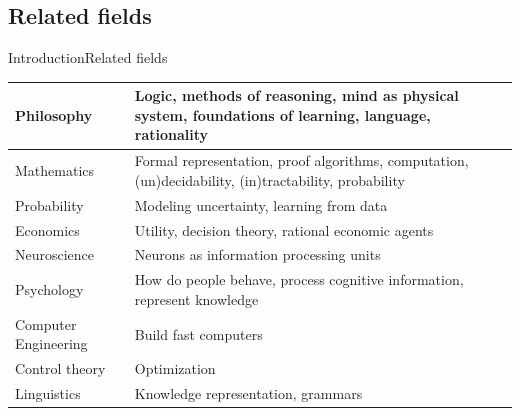 \documentclass[10pt,compress]{beamer} %
\begin{document}
\subsection{Related fields}
\begin{frame}{Introduction}{Related fields}
	\vspace{-0.8cm}
	\begin{center}
	\begin{tabular}{|p{2.5cm}|p{8cm}|}\hline
	Philosophy  & Logic, methods of reasoning, mind as physical system, foundations of learning, language, rationality\\\hline
	Mathematics & Formal representation, proof algorithms, computation, (un)decidability, (in)tractability, probability\\\hline
	Probability & Modeling uncertainty, learning from data\\\hline
	Economics   & Utility, decision theory, rational economic agents\\\hline
	Neuroscience& Neurons as information processing units\\\hline
	Psychology  & How do people behave, process cognitive information, represent knowledge\\\hline
	Computer Engineering & Build fast computers\\\hline
	Control theory & Optimization\\\hline
	Linguistics & Knowledge representation, grammars\\
	 \hline
	\end{tabular}
	\end{center}
\end{frame}

\end{document}
